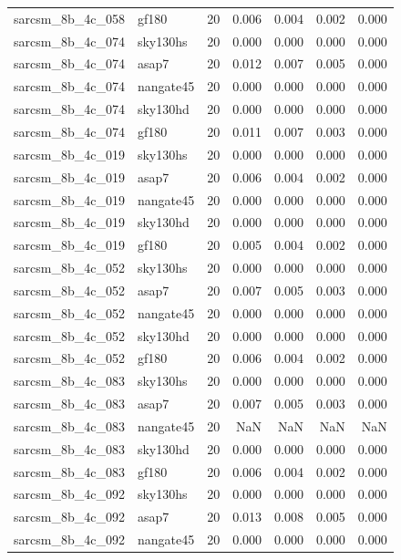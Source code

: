\begin{tabular}{llrrrrr}
sarcsm\_8b\_4c\_058 & gf180 & 20 & 0.006 & 0.004 & 0.002 & 0.000 \\
sarcsm\_8b\_4c\_074 & sky130hs & 20 & 0.000 & 0.000 & 0.000 & 0.000 \\
sarcsm\_8b\_4c\_074 & asap7 & 20 & 0.012 & 0.007 & 0.005 & 0.000 \\
sarcsm\_8b\_4c\_074 & nangate45 & 20 & 0.000 & 0.000 & 0.000 & 0.000 \\
sarcsm\_8b\_4c\_074 & sky130hd & 20 & 0.000 & 0.000 & 0.000 & 0.000 \\
sarcsm\_8b\_4c\_074 & gf180 & 20 & 0.011 & 0.007 & 0.003 & 0.000 \\
sarcsm\_8b\_4c\_019 & sky130hs & 20 & 0.000 & 0.000 & 0.000 & 0.000 \\
sarcsm\_8b\_4c\_019 & asap7 & 20 & 0.006 & 0.004 & 0.002 & 0.000 \\
sarcsm\_8b\_4c\_019 & nangate45 & 20 & 0.000 & 0.000 & 0.000 & 0.000 \\
sarcsm\_8b\_4c\_019 & sky130hd & 20 & 0.000 & 0.000 & 0.000 & 0.000 \\
sarcsm\_8b\_4c\_019 & gf180 & 20 & 0.005 & 0.004 & 0.002 & 0.000 \\
sarcsm\_8b\_4c\_052 & sky130hs & 20 & 0.000 & 0.000 & 0.000 & 0.000 \\
sarcsm\_8b\_4c\_052 & asap7 & 20 & 0.007 & 0.005 & 0.003 & 0.000 \\
sarcsm\_8b\_4c\_052 & nangate45 & 20 & 0.000 & 0.000 & 0.000 & 0.000 \\
sarcsm\_8b\_4c\_052 & sky130hd & 20 & 0.000 & 0.000 & 0.000 & 0.000 \\
sarcsm\_8b\_4c\_052 & gf180 & 20 & 0.006 & 0.004 & 0.002 & 0.000 \\
sarcsm\_8b\_4c\_083 & sky130hs & 20 & 0.000 & 0.000 & 0.000 & 0.000 \\
sarcsm\_8b\_4c\_083 & asap7 & 20 & 0.007 & 0.005 & 0.003 & 0.000 \\
sarcsm\_8b\_4c\_083 & nangate45 & 20 & NaN & NaN & NaN & NaN \\
sarcsm\_8b\_4c\_083 & sky130hd & 20 & 0.000 & 0.000 & 0.000 & 0.000 \\
sarcsm\_8b\_4c\_083 & gf180 & 20 & 0.006 & 0.004 & 0.002 & 0.000 \\
sarcsm\_8b\_4c\_092 & sky130hs & 20 & 0.000 & 0.000 & 0.000 & 0.000 \\
sarcsm\_8b\_4c\_092 & asap7 & 20 & 0.013 & 0.008 & 0.005 & 0.000 \\
sarcsm\_8b\_4c\_092 & nangate45 & 20 & 0.000 & 0.000 & 0.000 & 0.000 \\

\end{tabular}
